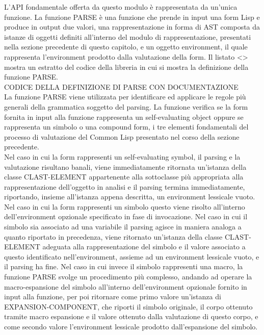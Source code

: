 L’API fondamentale offerta da questo modulo è rappresentata da un’unica
funzione. La funzione PARSE è una funzione che prende in input una form Lisp e
produce in output due valori, una rappresentazione in forma di AST composta da
istanze di oggetti definiti all’interno del modulo di rappresentazione,
presentati nella sezione precedente di questo capitolo, e un oggetto
environment, il quale rappresenta l’environment prodotto dalla valutazione
della form. Il listato <> mostra un estratto del codice della libreria in cui
si mostra la definizione della funzione PARSE.\\

CODICE DELLA DEFINIZIONE DI PARSE CON DOCUMENTAZIONE\\

La funzione PARSE viene utilizzata per identificare ed applicare le regole più
generali della grammatica soggetto del parsing. La funzione verifica se la
form fornita in input alla funzione rappresenta un self-evaluating object
oppure se rappresenta un simbolo o una compound form, i tre elementi
fondamentali del processo di valutazione del Common Lisp presentato nel corso
della sezione precedente.\\

Nel caso in cui la form rappresenti un self-evaluating symbol, il parsing e la
valutazione risultano banali, viene immediatamente ritornata un’istanza della
classe CLAST-ELEMENT appartenente alla sottoclasse più appropriata alla
rappresentazione dell’oggetto in analisi e il parsing termina immediatamente,
riportando, insieme all’istanza appena descritta, un environment lessicale
vuoto.\\

Nel caso in cui la form rappresenti un simbolo questo viene risolto
all’interno dell’environment opzionale specificato in fase di invocazione. Nel
caso in cui il simbolo sia associato ad una variabile il parsing agisce in
maniera analoga a quanto riportato in precedenza, viene ritornato un’istanza
della classe CLAST-ELEMENT adeguata alla rappresentazione del simbolo e il
valore associato a questo identificato nell’environment, assieme ad un
environment lessicale vuoto, e il parsing ha fine. Nel caso in cui invece il
simbolo rappresenti una macro, la funzione PARSE svolge un procedimento più
complesso, andando ad operare la macro-espansione del simbolo all’interno
dell’environment opzionale fornito in input alla funzione, per poi ritornare
come primo valore un’istanza di EXPANSION-COMPONENT, che riporti il simbolo
originale, il corpo ottenuto tramite macro espansione e il valore ottenuto
dalla valutazione di questo corpo, e come secondo valore l’environment
lessicale prodotto dall’espansione del simbolo.\\

